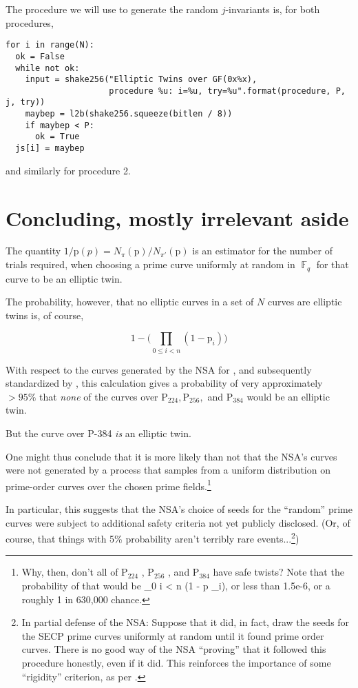 \documentclass[11pt,fleqn]{article}
\newcommand{\p}{\ensuremath{\mathup{p}} }
\newcommand{\Pa}{\ensuremath{\mathup{P}_{224}} }
\newcommand{\Pb}{\ensuremath{\mathup{P}_{256}} }
\newcommand{\Pc}{\ensuremath{\mathup{P}_{384}} }
\begin{document}
The procedure we will use to generate the random $j$-invariants is, for both procedures,

{\tiny
\begin{verbatim}
for i in range(N):
  ok = False
  while not ok:
    input = shake256("Elliptic Twins over GF(0x%x),
                     procedure %u: i=%u, try=%u".format(procedure, P, j, try))
    maybep = l2b(shake256.squeeze(bitlen / 8))
    if maybep < P:
      ok = True
  js[i] = maybep
\end{verbatim}
}

and similarly for procedure 2.



\section{Concluding, mostly irrelevant aside}

The quantity $1 / \p(p) = N_{\pi}(\p) / N_{\pi'}(\p)$ is an estimator for
the number of trials required, when choosing a prime curve uniformly at
random in $\BbbF_q$ for that curve to be an elliptic twin.

The probability, however, that no elliptic curves in a set of $N$ curves
are elliptic twins is, of course,

\begin{equation}
1 - \lparen \prod_{0 \leq i < n} (1 - \p_i) \rparen
\end{equation}

With respect to the curves generated by the NSA for \autocite{SECP1}, and
subsequently standardized by \autocite{recur}, this calculation gives a
probability of very approximately $> 95\%$ that \emph{none} of the curves
over $\Pa, \Pb,$ and $\Pc$ would be an elliptic twin.

But the curve over P-384 \emph{is} an elliptic twin.

One might thus conclude that it is more likely than not that the NSA's 
curves were not generated by a process that samples from a uniform
distribution on prime-order curves over the chosen prime fields.\footnote{
Why, then, don't all of \Pa, \Pb, and \Pc have safe twists? Note that the
probability of that would be \prod_{0 \leq i < n} (1 - \p_i), or less than
1.5e-6, or a roughly 1 in 630,000 chance.}

In particular, this suggests that the NSA's choice of seeds for the
``random'' prime curves were subject to additional safety criteria
not yet publicly disclosed. (Or, of course, that things with 5\%
probability aren't terribly rare events...\footnote{In partial defense of
the NSA: Suppose that it did, in fact, draw the seeds for the SECP prime
curves uniformly at random until it found prime order curves. There is no
good way of the NSA ``proving'' that it followed this procedure honestly,
even if it did. This reinforces the importance of some ``rigidity''
criterion, as per \autocite{NUMS}.})
\end{document}

